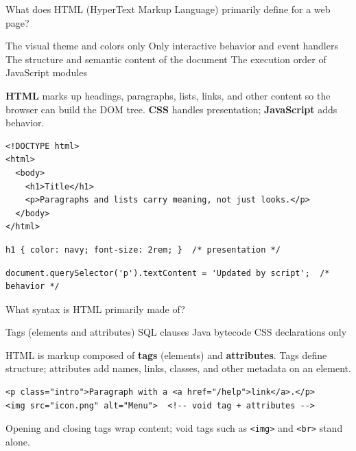 



\question[4]
What does HTML (HyperText Markup Language) primarily define for a web page?
\begin{choices}
  \choice The visual theme and colors only
  \choice Only interactive behavior and event handlers
  \CorrectChoice The structure and semantic content of the document
  \choice The execution order of JavaScript modules
\end{choices}
\begin{solution}
  \textbf{HTML} marks up headings, paragraphs, lists, links, and other content so the browser can build the DOM tree. \textbf{CSS} handles presentation; \textbf{JavaScript} adds behavior.
\begin{lstlisting}[style=htmlinline]
<!DOCTYPE html>
<html>
  <body>
    <h1>Title</h1>
    <p>Paragraphs and lists carry meaning, not just looks.</p>
  </body>
</html>
\end{lstlisting}
\begin{lstlisting}[style=css]
h1 { color: navy; font-size: 2rem; }  /* presentation */
\end{lstlisting}
\begin{lstlisting}[style=js]
document.querySelector('p').textContent = 'Updated by script';  /* behavior */
\end{lstlisting}
\end{solution}

\question[4]
What syntax is HTML primarily made of?
\begin{choices}
  \CorrectChoice Tags (elements and attributes)
  \choice SQL clauses
  \choice Java bytecode
  \choice CSS declarations only
\end{choices}
\begin{solution}
  HTML is markup composed of \textbf{tags} (elements) and \textbf{attributes}. Tags define structure; attributes add names, links, classes, and other metadata on an element.
\begin{lstlisting}[style=htmlinline]
<p class="intro">Paragraph with a <a href="/help">link</a>.</p>
<img src="icon.png" alt="Menu">  <!-- void tag + attributes -->
\end{lstlisting}
  Opening and closing tags wrap content; void tags such as \texttt{<img>} and \texttt{<br>} stand alone.
\end{solution}



